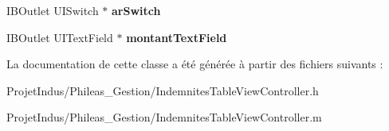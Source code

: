 \begin{DoxyCompactItemize}
\item 
\hypertarget{interface_indemnites_table_view_controller_adac071ef2da7b55297b42ed23d3c5715}{}I\+B\+Outlet U\+I\+Switch $\ast$ {\bfseries ar\+Switch}\label{interface_indemnites_table_view_controller_adac071ef2da7b55297b42ed23d3c5715}

\item 
\hypertarget{interface_indemnites_table_view_controller_af448edad169ce7ffc0058a21c72fbd3e}{}I\+B\+Outlet U\+I\+Text\+Field $\ast$ {\bfseries montant\+Text\+Field}\label{interface_indemnites_table_view_controller_af448edad169ce7ffc0058a21c72fbd3e}

\end{DoxyCompactItemize}


La documentation de cette classe a été générée à partir des fichiers suivants \+:\begin{DoxyCompactItemize}
\item 
Projet\+Indus/\+Phileas\+\_\+\+Gestion/Indemnites\+Table\+View\+Controller.\+h\item 
Projet\+Indus/\+Phileas\+\_\+\+Gestion/Indemnites\+Table\+View\+Controller.\+m\end{DoxyCompactItemize}
